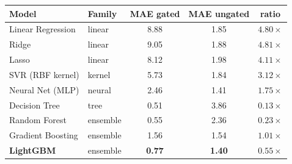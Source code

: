 \begin{tabular}{llccc}
\toprule
\textbf{Model} & \textbf{Family} & \textbf{MAE gated} & \textbf{MAE ungated} & \textbf{ratio} \\
\midrule
Linear Regression & linear & 8.88 & 1.85 & $4.80\times$ \\
Ridge & linear & 9.05 & 1.88 & $4.81\times$ \\
Lasso & linear & 8.12 & 1.98 & $4.11\times$ \\
SVR (RBF kernel) & kernel & 5.73 & 1.84 & $3.12\times$ \\
Neural Net (MLP) & neural & 2.46 & 1.41 & $1.75\times$ \\
\midrule
Decision Tree & tree & 0.51 & 3.86 & $0.13\times$ \\
Random Forest & ensemble & 0.55 & 2.36 & $0.23\times$ \\
Gradient Boosting & ensemble & 1.56 & 1.54 & $1.01\times$ \\
\textbf{LightGBM} & ensemble & \textbf{0.77} & \textbf{1.40} & $0.55\times$ \\
\bottomrule
\end{tabular}
